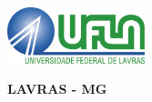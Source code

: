 
\setcounter{page}{0}
\thispagestyle{empty}
\section*{}
\vspace{-0.7cm}
\begin{singlespace}
\begin{center}
\includegraphics[width=4cm]{../figuras/UFLAlogo}\\
\vspace{.6cm}
\Large{\textbf{\teseauthorcap}}
\end{center}

\vfill

\vspace{-0.5cm}
\begin{center}
\begin{minipage}{10cm}
\begin{center}
\Large{\textbf{\tesetitlecap}} 
\end{center}
\end{minipage}
\end{center}

\vfill
\begin{center}
{\textbf{LAVRAS - MG\\ \teseyear}}
\end{center}
\end{singlespace}

\newpage\null\thispagestyle{empty}\newpage


